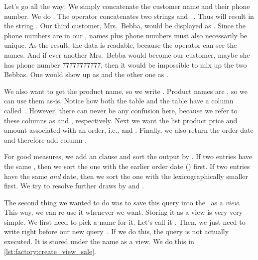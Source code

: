 Let's go all the way:
We simply concatenate the customer name and their phone number.
We do .
The \sqlIdx{\textbar\textbar} operator concatenates two strings  and ~\cite{PGDG:PD:SFAO}.
Thus  will result in the string .
Our third customer, Mrs.~Bebba, would be displayed as .
Since the phone numbers are  in our \db, names plus phone numbers must also necessarily be unique.
As the result, the data is readable, because the operator can see the names.
And if ever another Mrs.~Bebba would become our customer, maybe she has phone number 77777777777, then it would be impossible to mix up the two Bebbas.
One would show up as  and the other one as .

We also want to get the product name, so we write .
Product names are , so we can use them as-is.
Notice how both the table  and the table  have a column called~.
However, there can never be any confusion here, because we refer to these columns as  and , respectively.
Next we want the list product price and amount associated with an order, i.e.,  and .
Finally, we also return the order date and therefore add column .

For good measures, we add an  clause and sort the output by .
If two entries have the same , then we sort the one with the earlier order date () first.
If two entries have the same  \emph{and}  date, then we sort the one with the lexicographically smaller  first.
We try to resolve further draws by  and .

The second thing we wanted to do was to save this query into the \db\ as a \emph{view}.
This way, we can re-use it whenever we want.
Storing it as a view is very very simple.
We first need to pick a name for it.
Let's call it .
Then, we just need to write  right before our new query~\cite{PGDG:PD:CV}.
If we do this, the query is not actually executed.
It is stored under the name  as a view.
We do this in \cref{lst:factory:create_view_sale}.

